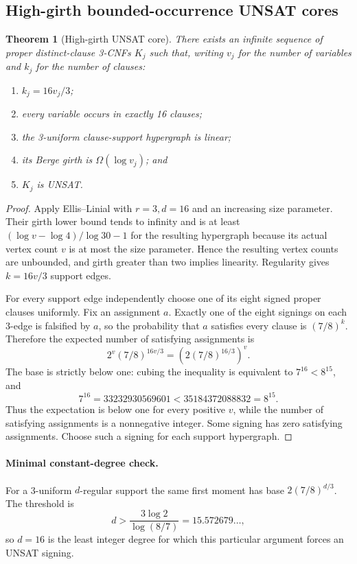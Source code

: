 \documentclass[11pt]{article}
\newtheorem{theorem}{Theorem}
\begin{document}
\subsection{High-girth bounded-occurrence UNSAT cores}
\begin{theorem}[High-girth UNSAT core]
There exists an infinite sequence of proper distinct-clause 3-CNFs $K_j$ such that, writing $v_j$ for the number of variables and $k_j$ for the number of clauses:
\begin{enumerate}
\item $k_j=16v_j/3$;
\item every variable occurs in exactly 16 clauses;
\item the 3-uniform clause-support hypergraph is linear;
\item its Berge girth is $\Omega(\log v_j)$; and
\item $K_j$ is UNSAT.
\end{enumerate}
\end{theorem}
\begin{proof}
Apply Ellis--Linial with $r=3,d=16$ and an increasing size parameter. Their girth lower bound tends to infinity and is at least $(\log v-\log4)/\log30-1$ for the resulting hypergraph because its actual vertex count $v$ is at most the size parameter. Hence the resulting vertex counts are unbounded, and girth greater than two implies linearity. Regularity gives $k=16v/3$ support edges.

For every support edge independently choose one of its eight signed proper clauses uniformly. Fix an assignment $a$. Exactly one of the eight signings on each 3-edge is falsified by $a$, so the probability that $a$ satisfies every clause is $(7/8)^k$. Therefore the expected number of satisfying assignments is
\[
2^v(7/8)^{16v/3}=\left(2(7/8)^{16/3}\right)^v.
\]
The base is strictly below one: cubing the inequality is equivalent to $7^{16}<8^{15}$, and
\[7^{16}=33232930569601<35184372088832=8^{15}.\]
Thus the expectation is below one for every positive $v$, while the number of satisfying assignments is a nonnegative integer. Some signing has zero satisfying assignments. Choose such a signing for each support hypergraph.
\end{proof}

\paragraph{Minimal constant-degree check.}
For a 3-uniform $d$-regular support the same first moment has base $2(7/8)^{d/3}$. The threshold is
\[d>\frac{3\log2}{\log(8/7)}=15.572679\ldots,\]
so $d=16$ is the least integer degree for which this particular argument forces an UNSAT signing.
\end{document}
